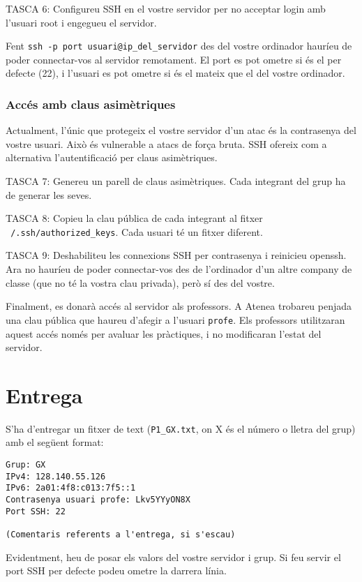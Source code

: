 \documentclass{practicaitic}
\begin{document}
TASCA 6: Configureu SSH en el vostre servidor per no acceptar login amb
l'usuari root i engegueu el servidor.

Fent \texttt{ssh -p port usuari@ip\_del\_servidor} des del vostre ordinador 
hauríeu de poder connectar-vos al servidor remotament. El port es pot ometre si
és el per defecte (22), i l'usuari es pot ometre si és el mateix que el del
vostre ordinador.

\subsubsection{Accés amb claus asimètriques}

Actualment, l'únic que protegeix el vostre servidor d'un atac és la contrasenya
del vostre usuari. Això és vulnerable a atacs de força bruta. SSH ofereix com a
alternativa l'autentificació per claus asimètriques.

TASCA 7: Genereu un parell de claus asimètriques. Cada integrant del grup ha de
generar les seves.

TASCA 8: Copieu la clau pública de cada integrant al fitxer
\texttt{~/.ssh/authorized\_keys}. Cada usuari té un fitxer diferent.

TASCA 9: Deshabiliteu les connexions SSH per contrasenya i reinicieu openssh.
Ara no hauríeu de poder connectar-vos des de l'ordinador d'un altre company
de classe (que no té la vostra clau privada), però sí des del vostre.

Finalment, es donarà accés al servidor als professors. A Atenea trobareu penjada
una clau pública que haureu d'afegir a l'usuari \texttt{profe}. Els professors
utilitzaran aquest accés només per avaluar les pràctiques, i no modificaran
l'estat del servidor.

\section{Entrega}
\label{sec:entrega}

S'ha d'entregar un fitxer de text (\texttt{P1\_GX.txt}, on X és el número o 
lletra del grup) amb el següent format:

\begin{verbatim}
Grup: GX
IPv4: 128.140.55.126
IPv6: 2a01:4f8:c013:7f5::1
Contrasenya usuari profe: Lkv5YYyON8X
Port SSH: 22

(Comentaris referents a l'entrega, si s'escau)
\end{verbatim}

Evidentment, heu de posar els valors del vostre servidor i grup. Si feu
servir el port SSH per defecte podeu ometre la darrera línia.
\end{document}
